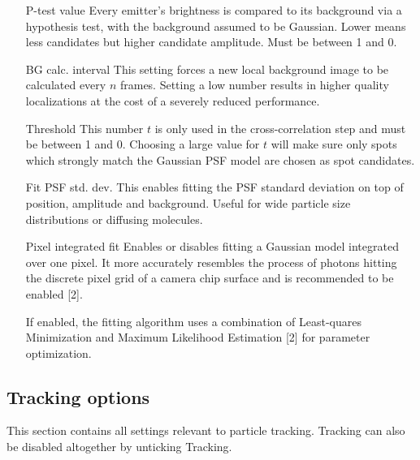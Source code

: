 \documentclass[11pt,onside]{report}
\makeatletter
\numberwithin{equation}{chapter}
\gdef\tshortstack{\@ifnextchar[\@tshortstack{\@tshortstack[c]}}
\gdef\@tshortstack[#1]{%
  \leavevmode
  \vtop\bgroup
    \baselineskip-\p@\lineskip 3\p@
    \let\mb@l\hss\let\mb@r\hss
    \expandafter\let\csname mb@#1\endcsname\relax
    \let\\\@stackcr
    \@ishortstack}
\makeatother
\begin{document}
\begin{itemize}[leftmargin=2cm]
\item[P-test value] Every emitter's brightness is compared to its background via a hypothesis test, with the background assumed to be Gaussian. Lower means less candidates but higher candidate amplitude. Must be between 1 and 0.
\item[BG calc. interval] This setting forces a new local background image to be calculated every $n$ frames. Setting a low number results in higher quality localizations at the cost of a severely reduced performance.
\item[Threshold] This number $t$ is only used in the cross-correlation step and must be between 1 and 0. Choosing a large value for $t$ will make sure only spots which strongly match the Gaussian PSF model are chosen as spot candidates.\\[0pt]%
%
\item[Fit PSF std. dev.] This enables fitting the PSF standard deviation on top of position, amplitude and background. Useful for wide particle size distributions or diffusing molecules.
\item[Pixel integrated fit] Enables or disables fitting a Gaussian model integrated over one pixel. It more accurately resembles the process of photons hitting the discrete pixel grid of a camera chip surface and is recommended to be enabled [2].
\item[\smash{\tshortstack[1]{Maximum Likeli- \\hood refinement}}] If enabled, the fitting algorithm uses a combination of Least-quares Minimization and Maximum Likelihood Estimation [2] for parameter optimization.
\end{itemize}

\subsection*{Tracking options}
This section contains all settings relevant to particle tracking. Tracking can also be disabled altogether by unticking \textsf{Tracking}.
\end{document}
